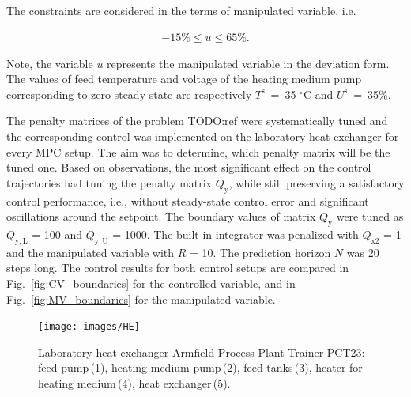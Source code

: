 \documentclass[preprint,12pt]{elsarticle}
\begin{document}
The constraints are considered in the terms of manipulated variable, i.e.

\begin{eqnarray}
\label{eq:u_const}
	-15\% \le u \le 65\%.
\end{eqnarray}

Note, the variable $u$ represents the manipulated variable in the deviation form. The values of feed temperature and voltage of the heating medium pump corresponding to zero steady state are respectively $T^\mathrm{s}$~=~35 $^{\circ}\mathrm{C}$ and $U^\mathrm{s}$~=~35\%.

The penalty matrices of the problem TODO:ref were systematically tuned and the corresponding control was implemented on the laboratory heat exchanger for every MPC setup. The aim was to determine, which penalty matrix will be the tuned one. Based on observations, the most significant effect on the control trajectories had tuning the penalty matrix $Q_\mathrm{y}$, while still preserving a satisfactory control performance, i.e., without steady-state control error and significant oscillations around the setpoint. The boundary values of matrix $Q_\mathrm{y}$ were tuned as $Q_\mathrm{y, L}$ = 100 and $Q_\mathrm{y, U}$ = 1000. The built-in integrator was penalized with $Q_\mathrm{x2}$ = 1 and the manipulated variable with $R$ = 10. The prediction horizon $N$ was 20 steps long. The control results for both control setups are compared in Fig.~\ref{fig:CV_boundaries} for the controlled variable, and in Fig.~\ref{fig:MV_boundaries} for the manipulated variable.
    

\begin{figure}
	\begin{center}
		\texttt{[image: images/HE]}
		\caption[Heat exchanger Armfield Process Plant Trainer PCT23]{Laboratory heat exchanger Armfield Process Plant Trainer PCT23: feed pump\,(1), heating medium pump\,(2), feed tanks\,(3), heater for heating medium\,(4), heat exchanger\,(5).}
		\label{fig:HE}
	\end{center}
\end{figure}
\end{document}
